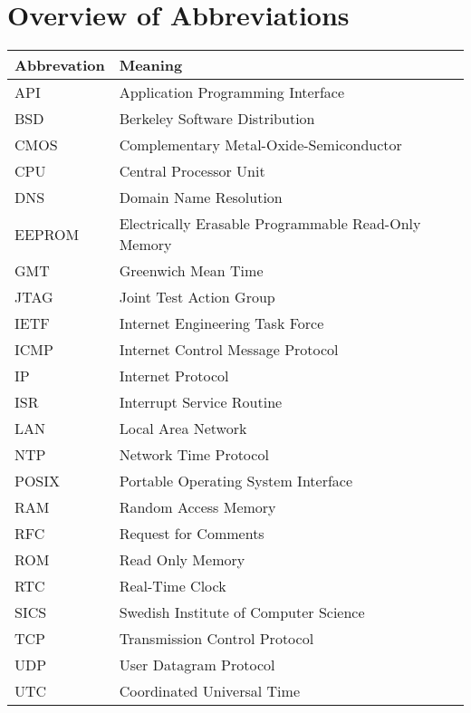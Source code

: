 \chapter{Overview of Abbreviations}
\begin{tabular}{|l|l|l|}
	\hline
	Abbrevation & Meaning \\ \hline
	API & Application Programming Interface \\
	BSD & Berkeley Software Distribution \\
	CMOS & Complementary Metal-Oxide-Semiconductor \\
	CPU & Central Processor Unit \\
	DNS & Domain Name Resolution \\
	EEPROM & Electrically Erasable Programmable Read-Only Memory \\
	GMT & Greenwich Mean Time \\
	JTAG & Joint Test Action Group \\
	IETF & Internet Engineering Task Force \\
	ICMP & Internet Control Message Protocol \\
	IP & Internet Protocol \\
	ISR & Interrupt Service Routine \\
	LAN & Local Area Network \\
	NTP & Network Time Protocol \\
	POSIX & Portable Operating System Interface \\
	RAM & Random Access Memory \\
	RFC & Request for Comments \\
	ROM & Read Only Memory \\
	RTC & Real-Time Clock \\
	SICS & Swedish Institute of Computer Science \\
	TCP & Transmission Control Protocol \\
	UDP & User Datagram Protocol \\
	UTC & Coordinated Universal Time \\
	\hline
\end{tabular}
